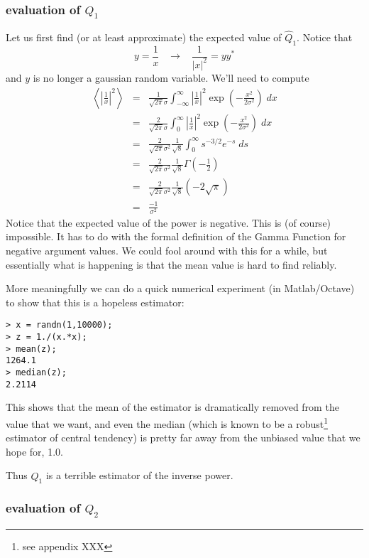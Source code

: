\subsubsection{evaluation of $Q_1$}

Let us first find (or at least approximate) the expected value of
$\hat{Q}_1$.   Notice that
\begin{displaymath}
y = \frac{1}{x} \;\;\; \rightarrow \;\;\; \frac{1}{|x|^2} = yy^\ast
\end{displaymath}
and $y$ is no longer a gaussian random variable.   We'll need to
compute
\begin{eqnarray}
\left\langle \left| \frac{1}{x} \right|^2 \right\rangle &=&
\frac{1}{\sqrt{2\pi} \sigma} \int_{-\infty}^\infty
\left|\frac{1}{x}\right|^2 \exp\left(-\frac{x^2}{2\sigma^2}\right) \;
dx \\
&=& \frac{2}{\sqrt{2\pi} \sigma} \int_{0}^\infty
\left|\frac{1}{x}\right|^2 \exp\left(-\frac{x^2}{2\sigma^2}\right) \;
dx\\
&=& \frac{2}{\sqrt{2\pi} \sigma^2} \frac{1}{\sqrt{8}} \int_{0}^\infty
s^{-3/2} e^{-s} \; ds \\
&=&\frac{2}{\sqrt{2\pi} \sigma^2} \frac{1}{\sqrt{8}}
\Gamma\left(-\frac{1}{2}\right) \\
&=&\frac{2}{\sqrt{2\pi} \sigma^2} \frac{1}{\sqrt{8}}
(-2\sqrt{\pi})\\
&=& \frac{-1}{\sigma^2}
\end{eqnarray}
Notice that the expected value of the power is negative.  This is (of
course) impossible.  It has to do with the formal definition of the
Gamma Function for negative argument values.  We could fool around
with this for a while, but essentially what is happening is that the
mean value is hard to find reliably.

More meaningfully we can do a quick numerical experiment (in
Matlab/Octave) to show that this is a hopeless estimator:
\begin{verbatim}
> x = randn(1,10000);
> z = 1./(x.*x);
> mean(z);
1264.1
> median(z);
2.2114
\end{verbatim}
This shows that the mean of the estimator is dramatically removed from
the value that we want, and even the median (which is known to be a
robust\footnote{see appendix XXX} estimator of central tendency) is
pretty far away from the unbiased value that we hope for, 1.0.

Thus $\hat{Q}_1$ is a terrible estimator of the inverse power.

\subsubsection{evaluation of $Q_2$}

